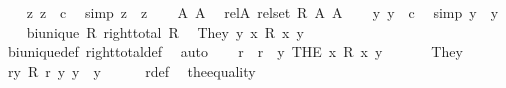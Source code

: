 \begin{isabellebody}
\ \ \isamarkupfalse%
\ z{}\ z{}\ {\isacharcolon}{\kern0pt}{\isacharcolon}{\kern0pt}\ {\isacharprime}{\kern0pt}c\ \isamarkupfalse%
\ {\isacharbrackleft}{\kern0pt}simp{\isacharbrackright}{\kern0pt}{\isacharcolon}{\kern0pt}\ {\isachardoublequoteopen}z{}\ {\isacharequal}{\kern0pt}\ z{}{\isachardoublequoteclose}\isanewline
\ \ \isamarkupfalse%
\ A{}\ A{}\ \isamarkupfalse%
\ rel{\isacharunderscore}{\kern0pt}A{\isacharcolon}{\kern0pt}\ {\isachardoublequoteopen}rel{\isacharunderscore}{\kern0pt}set\ R\ A{}\ A{}{\isachardoublequoteclose}\isanewline
\ \ \isamarkupfalse%
\ y{}\ y{}\ {\isacharcolon}{\kern0pt}{\isacharcolon}{\kern0pt}\ {\isacharprime}{\kern0pt}c\ \isamarkupfalse%
\ {\isacharbrackleft}{\kern0pt}simp{\isacharbrackright}{\kern0pt}{\isacharcolon}{\kern0pt}\ {\isachardoublequoteopen}y{}\ {\isacharequal}{\kern0pt}\ y{}{\isachardoublequoteclose}\isanewline
\isanewline
\ \ \isamarkupfalse%
\ {\isacartoucheopen}bi{\isacharunderscore}{\kern0pt}unique\ R{\isacartoucheclose}\ {\isacartoucheopen}right{\isacharunderscore}{\kern0pt}total\ R{\isacartoucheclose}\ \isamarkupfalse%
\ The{\isacharunderscore}{\kern0pt}y{\isacharcolon}{\kern0pt}\ {\isachardoublequoteopen}{\isasymforall}y{\isachardot}{\kern0pt}\ {\isasymexists}{\isacharbang}{\kern0pt}x{\isachardot}{\kern0pt}\ R\ x\ y{\isachardoublequoteclose}\isanewline
\ \ \ \ \isamarkupfalse%
\ bi{\isacharunderscore}{\kern0pt}unique{\isacharunderscore}{\kern0pt}def\ right{\isacharunderscore}{\kern0pt}total{\isacharunderscore}{\kern0pt}def\ \isamarkupfalse%
\ auto\isanewline
\ \ \isamarkupfalse%
\ r\ \ {\isachardoublequoteopen}r\ {\isasymequiv}\ {\isasymlambda}y{\isachardot}{\kern0pt}\ THE\ x{\isachardot}{\kern0pt}\ R\ x\ y{\isachardoublequoteclose}\isanewline
\ \ \isanewline
\ \ \isamarkupfalse%
\ The{\isacharunderscore}{\kern0pt}y\ \isamarkupfalse%
\ r{\isacharunderscore}{\kern0pt}y{\isacharcolon}{\kern0pt}\ {\isachardoublequoteopen}R\ {\isacharparenleft}{\kern0pt}r\ y{\isacharparenright}{\kern0pt}\ y{\isachardoublequoteclose}\ \ y\isanewline
\ \ \ \ \isamarkupfalse%
\ r{\isacharunderscore}{\kern0pt}def\ \isamarkupfalse%
\ the{\isacharunderscore}{\kern0pt}equality\ \isamarkupfalse%

\end{isabellebody}
